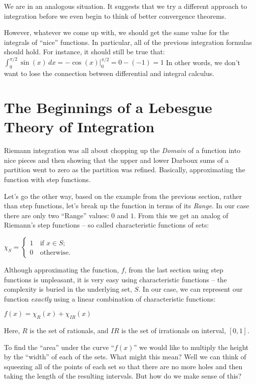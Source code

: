 \documentclass{article}
\begin{document}
We are in an analogous situation. It suggests that 
we try a different approach to integration before we even
begin to think of better convergence theorems. 

However, whatever we come up with, we should get the same value for the 
integrals of ``nice'' functions. In particular, all of the previous integration 
formulas should hold. For instance, it should still be true that: 
$\int_0^{\pi / 2} \sin(x) \, dx = -\cos(x)|_{0}^{\pi / 2} = 0 - (-1) = 1$
In other words, we don't want to lose the connection between differential and
integral calculus.


\section{The Beginnings of a Lebesgue Theory of Integration}

Riemann integration was all about chopping up the {\em Domain\/} of a function into nice 
pieces and then showing that the upper and lower Darboux sums of a partition 
went to zero as the partition was refined. Basically, approximating the function 
with step functions.

Let's go the other way, based on the example from the previous section, rather 
than step functions, let's break up the function in terms of its {\em Range\/}. 
In our case there are only two ``Range'' values: $0$ and $1$. From this we get an 
analog of Riemann's step functions -- 
so called characteristic functions of sets:

$\chi_{S} = \begin{cases} 1 \quad \text{if $x \in  S$;} \\ 0 \quad \text{otherwise.} \end{cases}$

Although approximating the function, $f$, from the last section using step 
functions is unpleasant, it is very easy using characteristic functions -- the complexity 
is buried in the underlying set, $S$. In our case, we can represent our function {\em exactly\/}
using a linear combination of characteristic functions:

$f(x) = \chi_{R}(x) + \chi_{IR}(x)$

Here, $R$ is the set of rationals, and $IR$ is the set of irrationals on interval, $[0, 1]$.

To find the ``area'' under the curve ``$f(x)$'' we would like to multiply the 
height by the ``width'' of each of the sets. What might this mean?
Well we can think of squeezing all of the points of each set so that there are 
no more holes and then taking the length of the resulting intervals.
But how do we make sense of this?
\end{document}
